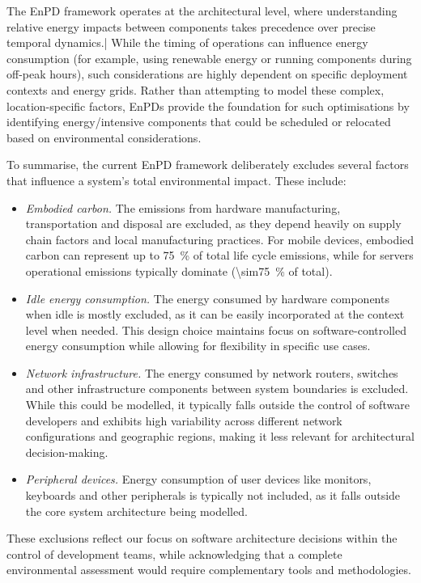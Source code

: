 The EnPD framework operates at the architectural level, where understanding relative energy impacts between components takes precedence over precise temporal dynamics.|
While the timing of operations can influence energy consumption (for example, using renewable energy or running components during off-peak hours), such considerations are highly dependent on specific deployment contexts and energy grids.
Rather than attempting to model these complex, location-specific factors, EnPDs provide the foundation for such optimisations by identifying energy\-/intensive components that could be scheduled or relocated based on environmental considerations.

To summarise, the current EnPD framework deliberately excludes several factors that influence a system's total environmental impact.
These include:
\begin{itemize}
  \item \emph{Embodied carbon.} The emissions from hardware manufacturing, transportation and disposal are excluded, as they depend heavily on supply chain factors and local manufacturing practices.
  For mobile devices, embodied carbon can represent up to \qty{75}{\percent} of total life cycle emissions, while for servers operational emissions typically dominate (\qty{\sim75}{\percent} of total).
  \item \emph{Idle energy consumption.} The energy consumed by hardware components when idle is mostly excluded, as it can be easily incorporated at the context level when needed.
  This design choice maintains focus on soft\-ware-controlled energy consumption while allowing for flexibility in specific use cases.
  \item \emph{Network infrastructure.} The energy consumed by network routers, switches and other infrastructure components between system boundaries is excluded.
  While this could be modelled, it typically falls outside the control of software developers and exhibits high variability across different network configurations and geographic regions, making it less relevant for architectural decision-making.
  \item \emph{Peripheral devices.} Energy consumption of user devices like monitors, keyboards and other peripherals is typically not included, as it falls outside the core system architecture being modelled.
\end{itemize}

These exclusions reflect our focus on software architecture decisions within the control of development teams, while acknowledging that a complete environmental assessment would require complementary tools and methodologies.


